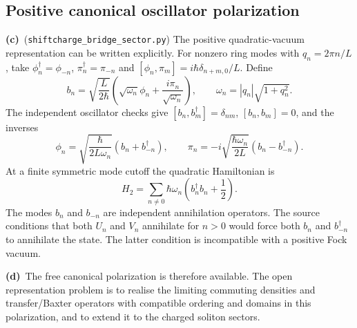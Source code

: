 \documentclass[11pt,a4paper]{article}
\newcommand{\C}{\textbf{(c)}\ }
\newcommand{\D}{\textbf{(d)}\ }
\newcommand{\file}[1]{\nolinkurl{#1}}
\newcommand{\scs}{\file{shiftcharge_bridge_sector.py}}
\begin{document}
\subsection{Positive canonical oscillator polarization}
\C (\scs) The positive quadratic-vacuum representation can be written
explicitly. For nonzero ring modes with $q_n=2\pi n/L$, take
$\phi_n^\dagger=\phi_{-n}$,
$\pi_n^\dagger=\pi_{-n}$ and
$[\phi_n,\pi_m]=i\hbar\delta_{n+m,0}/L$. Define
\begin{equation}
 b_n=\sqrt{\frac{L}{2\hbar}}
 \left(\sqrt{\omega_n}\phi_n+\frac{i\pi_n}{\sqrt{\omega_n}}\right),
 \qquad \omega_n=|q_n|\sqrt{1+q_n^2}.
 \label{polarization}
\end{equation}
The independent oscillator checks give
$[b_n,b_m^\dagger]=\delta_{nm}$, $[b_n,b_m]=0$, and the inverses
\begin{equation}
 \phi_n=\sqrt{\frac{\hbar}{2L\omega_n}}(b_n+b_{-n}^\dagger),
 \qquad
 \pi_n=-i\sqrt{\frac{\hbar\omega_n}{2L}}(b_n-b_{-n}^\dagger).
\end{equation}
At a finite symmetric mode cutoff the quadratic Hamiltonian is
\begin{equation}
 H_2=\sum_{n\ne0}\hbar\omega_n
 \left(b_n^\dagger b_n+\frac12\right).
 \label{positive-energy}
\end{equation}
The modes $b_n$ and $b_{-n}$ are independent annihilation operators.
The source conditions that both $U_n$ and $V_n$ annihilate for $n>0$
would force both $b_n$ and $b_{-n}^\dagger$ to annihilate the state.
The latter condition is incompatible with a positive Fock vacuum.

\D The free canonical polarization is therefore available. The open
representation problem is to realise the limiting commuting densities and
transfer/Baxter operators with compatible ordering and domains in this
polarization, and to extend it to the charged soliton sectors.
\end{document}
